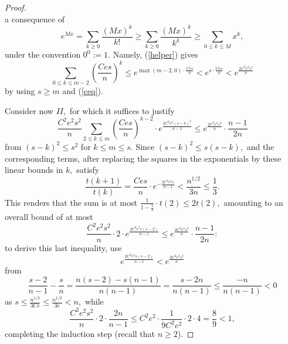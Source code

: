 \documentclass{article}
\numberwithin{equation}{section}
\begin{document}
\begin{proof}
\begin{equation}
    \end{equation}
    a consequence of
    \[e^{Mx}=\sum_{k \geq 0}{\frac{(Mx)^k}{k!}} \geq \sum_{k \geq 0}{\frac{(Mx)^k}{k^k}} \geq \sum_{0 \leq k \leq M}{x^k},\]
    under the convention \(0^0:=1.\) Namely, (\ref{helper}) gives
    \[\sum_{0 \leq k \leq m-2}{(\frac{Ces}{n})^{k}} \leq e^{\max{(m-2,0)} \cdot \frac{Ces}{n}}<e^{s \cdot \frac{Ces}{n}}< e^{\frac{2C^2e^2s^2}{n}}\]
    by using \(s \geq m\) and (\ref{ceq}). %
    \par
    Consider now \(II,\) for which it suffices to justify
    \[\frac{C^2e^2s^2}{n}\sum_{2 \leq k \leq m}{(\frac{Ces}{n})^{k-2} \cdot e^{\frac{2C^2e^2(s-k)^2}{n-1}}} \leq e^{\frac{2C^2e^2s^2}{n}} \cdot \frac{n-1}{2n}\]
    from \((s-k)^2 \leq s^2\) for \(k \leq m \leq s.\) Since \((s-k)^2 \leq s(s-k),\) and the corresponding terms, after replacing the squares in the exponentials by these linear bounds in \(k,\) satisfy
    \[\frac{t(k+1)}{t(k)}=\frac{Ces}{n} \cdot e^{-\frac{2C^2e^2s}{n-1}}< \frac{n^{1/2}}{3n} \leq \frac{1}{3}.\]
    This renders that the sum is at most \(\frac{1}{1-\frac{1}{3}} \cdot t(2) \leq 2t(2),\) amounting to an overall bound of at most
    \[\frac{C^2e^2s^2}{n} \cdot 2 \cdot e^{\frac{2C^2e^2s(s-2)}{n-1}} \leq e^{\frac{2C^2e^2s^2}{n}} \cdot \frac{n-1}{2n}:\]
    to derive this last inequality, use
    \[e^{\frac{2C^2e^2s(s-2)}{n-1}}< e^{\frac{2C^2e^2s^2}{n}}\]
    from 
    \[\frac{s-2}{n-1}-\frac{s}{n}=\frac{n(s-2)-s(n-1)}{n(n-1)}=\frac{s-2n}{n(n-1)} \leq \frac{-n}{n(n-1)}<0\] 
    as \(s \leq \frac{n^{1/2}}{3Ce} \leq \frac{n^{1/2}}{3e}<n,\) while 
    \[\frac{C^2e^2s^2}{n} \cdot 2 \cdot \frac{2n}{n-1} \leq C^2e^2 \cdot \frac{1}{9C^2e^2}\cdot 2 \cdot 4=\frac{8}{9}<1,\]
    completing the induction step (recall that \(n \geq 2\)).
    
\end{proof}
\end{document}
